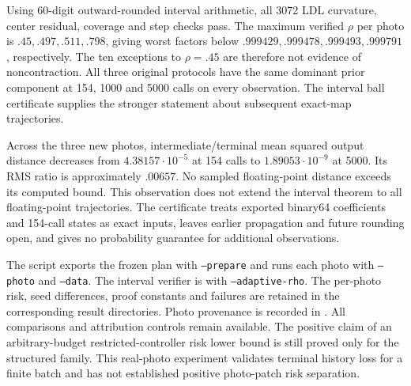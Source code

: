 Using 60-digit outward-rounded interval arithmetic, all 3072
LDL curvature, center residual, coverage and step checks pass.
The maximum verified $\rho$ per photo is $.45,.497,.511,.798$,
giving worst factors below
$.999429,.999478,.999493,.999791$, respectively.
The ten exceptions to $\rho=.45$ are therefore not evidence of
noncontraction.
All three original protocols have the same dominant prior component
at 154, 1000 and 5000 calls on every observation.
The interval ball certificate supplies the stronger statement
about subsequent exact-map trajectories.



Across the three new photos, intermediate/terminal mean squared
output distance decreases from $4.38157\cdot10^{-5}$ at 154 calls
to $1.89053\cdot10^{-9}$ at 5000.
Its RMS ratio is approximately $.00657$.
No sampled floating-point distance exceeds its computed bound.
This observation does not extend the interval theorem to all
floating-point trajectories.
The certificate treats exported binary64 coefficients and
154-call states as exact inputs, leaves earlier propagation and
future rounding open, and gives no probability guarantee for
additional observations.

The script 
exports the frozen plan with \texttt{--prepare} and runs each photo
with \texttt{--photo} and \texttt{--data}.
The interval verifier is
with \texttt{--adaptive-rho}.
The per-photo risk, seed differences, proof constants and failures
are retained in the corresponding result directories.
Photo provenance is recorded in
.
All comparisons and attribution controls remain available.
The positive claim of an arbitrary-budget restricted-controller
risk lower bound is still proved only for the structured family.
This real-photo experiment validates terminal history loss for a
finite batch and has not established positive photo-patch risk
separation.
